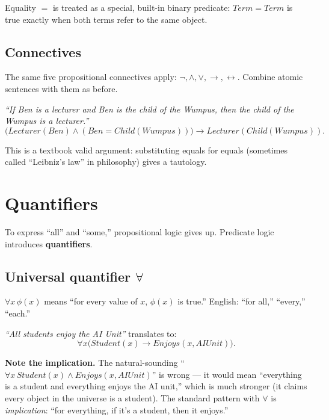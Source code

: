 \documentclass[11pt, a4paper]{article}
\begin{document}
Equality $=$ is treated as a special, built-in binary predicate: $Term = Term$ is true exactly when both terms refer to the same object.

\subsection{Connectives}

The same five propositional connectives apply: $\neg, \land, \lor, \rightarrow, \leftrightarrow$. Combine atomic sentences with them as before.

\begin{exbox}
\textit{``If Ben is a lecturer and Ben is the child of the Wumpus, then the child of the Wumpus is a lecturer.''}
\[
\bigl(Lecturer(Ben) \land (Ben = Child(Wumpus))\bigr) \rightarrow Lecturer(Child(Wumpus)).
\]
\end{exbox}

This is a textbook valid argument: substituting equals for equals (sometimes called ``Leibniz's law'' in philosophy) gives a tautology.

\section{Quantifiers}

To express ``all'' and ``some,'' propositional logic gives up. Predicate logic introduces \textbf{quantifiers}.

\subsection{\texorpdfstring{Universal quantifier $\forall$}{Universal quantifier (forall)}}

\begin{defbox}
$\forall x \, \phi(x)$ means ``for every value of $x$, $\phi(x)$ is true.'' English: ``for all,'' ``every,'' ``each.''
\end{defbox}

\textit{``All students enjoy the AI Unit''} translates to:
\[
\forall x \bigl(Student(x) \rightarrow Enjoys(x, AIUnit)\bigr).
\]

\textbf{Note the implication.} The natural-sounding ``$\forall x \, Student(x) \land Enjoys(x, AIUnit)$'' is wrong — it would mean ``everything is a student and everything enjoys the AI unit,'' which is much stronger (it claims every object in the universe is a student). The standard pattern with $\forall$ is \emph{implication}: ``for everything, if it's a student, then it enjoys.''
\end{document}
